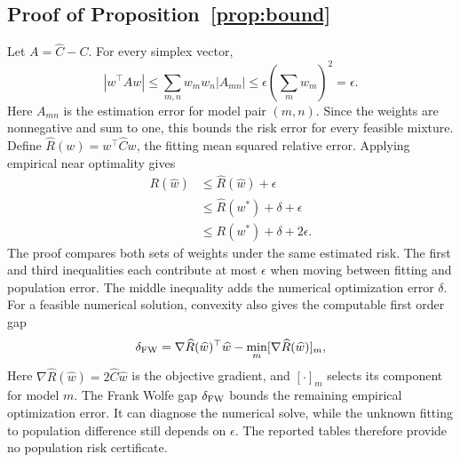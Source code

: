 \subsection{Proof of Proposition~\ref{prop:bound}}
Let $A=\widehat C-C$. For every simplex vector,
\begin{equation}
 |w^\top Aw|\leq\sum_{m,n}w_mw_n|A_{mn}|
\leq\epsilon\left(\sum_m w_m\right)^2=\epsilon.
\end{equation}
Here $A_{mn}$ is the estimation error for model pair $(m,n)$. Since the weights
are nonnegative and sum to one, this bounds the risk error for every feasible mixture.
Define $\widehat R(w)=w^\top\widehat Cw$, the fitting mean squared relative
error. Applying empirical near optimality gives
\begin{align}
 R(\widehat w)&\leq\widehat R(\widehat w)+\epsilon\\
 &\leq\widehat R(w^*)+\delta+\epsilon\\
 &\leq R(w^*)+\delta+2\epsilon.
\end{align}
The proof compares both sets of weights under the same estimated risk.
The first and third inequalities each contribute at most $\epsilon$ when
moving between fitting and population error. The middle inequality adds
the numerical optimization error $\delta$. For a feasible numerical solution,
convexity also gives the computable first order gap
\begin{equation}
 \delta_{\rm FW}=\nabla\widehat R(\widehat w)^\top\widehat w
                  -\min_m[\nabla\widehat R(\widehat w)]_m,
\end{equation}
Here $\nabla\widehat R(\widehat w)=2\widehat C\widehat w$ is the objective gradient,
and $[\cdot]_m$ selects its component for model $m$. The Frank Wolfe gap
$\delta_{\rm FW}$ bounds the remaining empirical optimization error. It can
diagnose the numerical solve, while the unknown fitting to population
difference still depends on $\epsilon$. The reported tables therefore provide
no population risk certificate.

